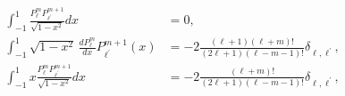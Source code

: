 \begin{align}
    \int_{-1}^{1} \frac{P_{\ell}^{m} P_{\ell^{\prime}}^{m+1}}{\sqrt{1-x^2}} dx &= 0, \\
    \int_{-1}^{1} \sqrt{1-x^2} \,\frac{dP_{\ell}^{m}}{dx} P_{\ell^{\prime}}^{m+1} (x) &= -2\frac{(\ell+1)(\ell+m)!}{(2\ell+1)(\ell-m-1)!}\delta_{\ell,\ell^{\prime}},\\
    \int_{-1}^{1} x \frac{P_{\ell}^{m} P_{\ell^{\prime}}^{m+1}}{\sqrt{1-x^2}} dx &= -2\frac{(\ell+m)!}{(2\ell+1)(\ell-m-1)!}\delta_{\ell,\ell^{\prime}},\\

\end{align}
